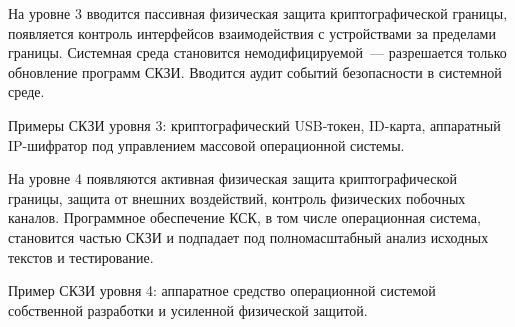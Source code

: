 На уровне 3 вводится пассивная физическая защита криптографической границы,
появляется контроль интерфейсов взаимодействия с устройствами за пределами 
границы. Системная среда становится немодифицируемой~--- разрешается только 
обновление программ СКЗИ. Вводится аудит событий безопасности в системной среде.

Примеры СКЗИ уровня 3: криптографический USB-токен, ID-карта, 
аппаратный IP-шифратор под управлением массовой операционной системы.

На уровне 4 появляются активная физическая защита криптографической границы,
защита от внешних воздействий, 
контроль физических побочных каналов.
%
%
Программное обеспечение КСК, в том числе операционная система, становится 
частью СКЗИ и подпадает под полномасштабный анализ исходных текстов и 
тестирование. 
%

Пример СКЗИ уровня 4: аппаратное средство 
 операционной системой собственной разработки
и усиленной физической защитой. 

